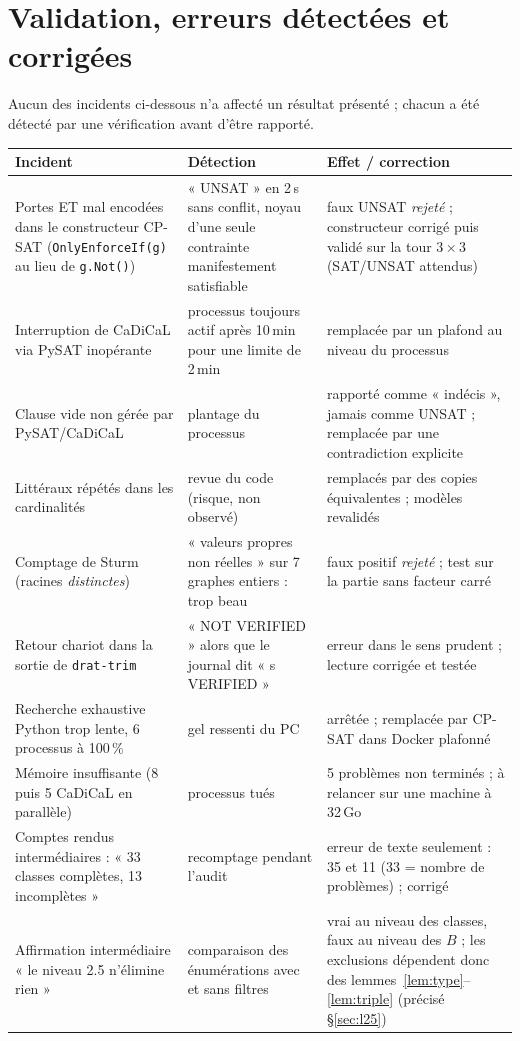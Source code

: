 \documentclass[11pt,a4paper]{article}
\theoremstyle{remark}
\newcommand{\code}[1]{\texttt{#1}}
\begin{document}
\section{Validation, erreurs détectées et corrigées}\label{sec:incidents}
Aucun des incidents ci-dessous n'a affecté un résultat présenté ; chacun a été détecté par une vérification avant d'être rapporté.
\begin{longtable}{p{4.3cm}p{5.6cm}p{5.6cm}}
\toprule Incident & Détection & Effet / correction\\\midrule
Portes ET mal encodées dans le constructeur CP-SAT (\code{OnlyEnforceIf(g)} au lieu de \code{g.Not()}) & « UNSAT » en 2\,s sans conflit, noyau d'une seule
contrainte manifestement satisfiable & faux UNSAT \emph{rejeté} ; constructeur corrigé puis validé sur la tour $3\times3$ (SAT/UNSAT attendus)\\
Interruption de CaDiCaL via PySAT inopérante & processus toujours actif après 10\,min pour une limite de 2\,min & remplacée par un plafond au niveau du processus\\
Clause vide non gérée par PySAT/CaDiCaL & plantage du processus & rapporté comme « indécis », jamais comme UNSAT ; remplacée par une contradiction explicite\\
Littéraux répétés dans les cardinalités & revue du code (risque, non observé) & remplacés par des copies équivalentes ; modèles revalidés\\
Comptage de Sturm (racines \emph{distinctes}) & « valeurs propres non réelles » sur 7 graphes entiers : trop beau & faux positif \emph{rejeté} ; test sur la partie sans
facteur carré\\
Retour chariot dans la sortie de \code{drat-trim} & « NOT VERIFIED » alors que le journal dit « s VERIFIED » & erreur dans le sens prudent ; lecture corrigée et testée\\
Recherche exhaustive Python trop lente, 6 processus à 100\,\% & gel ressenti du PC & arrêtée ; remplacée par CP-SAT dans Docker plafonné\\
Mémoire insuffisante (8 puis 5 CaDiCaL en parallèle) & processus tués & 5 problèmes non terminés ; à relancer sur une machine à 32\,Go\\
Comptes rendus intermédiaires : « 33 classes complètes, 13 incomplètes » & recomptage pendant l'audit & erreur de texte seulement : 35 et 11 (33 = nombre de
problèmes) ; corrigé\\
Affirmation intermédiaire « le niveau 2.5 n'élimine rien » & comparaison des énumérations avec et sans filtres & vrai au niveau des classes, faux au niveau des $B$ ;
les exclusions dépendent donc des lemmes~\ref{lem:type}--\ref{lem:triple} (précisé §\ref{sec:l25})\\
\bottomrule
\end{longtable}
\end{document}
